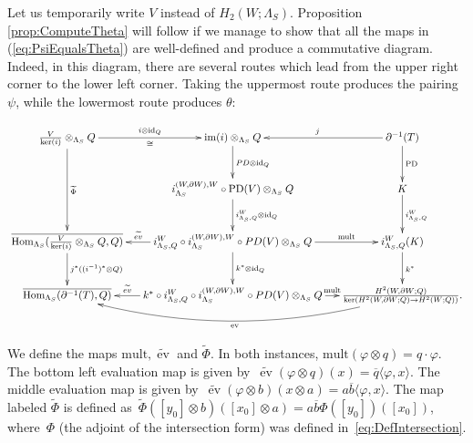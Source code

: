 \documentclass[11pt,a4paper]{amsart}
\theoremstyle{definition}
\newcommand{\id}{\operatorname{id}}
\newcommand{\im}{\operatorname{im}}
\DeclareMathOperator{\ev}{ev}
\def\op{\operatorname}
\begin{document}
Let us temporarily write $V$ instead of $H_2(W;\Lambda_S)$. Proposition \ref{prop:ComputeTheta} will follow if we manage to show that all the maps in (\ref{eq:PsiEqualsTheta}) are well-defined and produce a commutative diagram. Indeed, in this diagram, there are several routes which lead from the upper right corner to the lower left corner. Taking the uppermost route produces the pairing $\psi$, while the lowermost route produces $\theta$:

\begin{equation}
\label{eq:PsiEqualsTheta}
\xymatrix@R1cm@C0.45cm{
\frac{V}{\ker(i)} \otimes_{\Lambda_S} Q \ar[dd]^{\widetilde{\Phi}} \ar[r]^{i \otimes \id_Q}_\cong
& \im(i) \otimes_{\Lambda_S} Q \ar[d]^{PD \otimes  \id_Q}
& \partial^{-1}(T) \ar[l]_j \ar[d]^{\text{PD}} \\
&i_{\Lambda_S}^{(W,\partial W),W} \circ \text{PD} (V)  \otimes_{\Lambda_S} Q \ar[d]^{i^W_{\Lambda_S,Q} \otimes \id_Q}
& K \ar[d]^{i^W_{\Lambda_S,Q}} \\
\overline{\op{Hom}_{\Lambda_S}(\frac{V}{\ker(i)} \otimes_{\Lambda_S} Q,Q)}  \ar[d]^{  j^*((i^{-1})^*\otimes Q)  }
&  i^W_{\Lambda_S,Q} \circ i_{\Lambda_S}^{(W,\partial W),W} \circ PD(V)\otimes_{\Lambda_S} Q \ar[l]_-{{\widetilde{ev}}}  \ar[d]^{k^* \otimes \id_Q}  \ar[r]^-{\text{mult}}
&i^W_{\Lambda_S,Q}(K)  \ar[d]^{k^*}\\
\overline{\op{Hom}_{\Lambda_S}(\partial^{-1}(T),Q)} 
&  k^* \circ i^W_{\Lambda_S,Q} \circ i_{\Lambda_S}^{(W,\partial W),W} \circ PD(V) \otimes_{\Lambda_S} Q  \ar[r]^-{\text{mult}}  \ar[l]_-{{\widetilde{ev}}}
& \frac{H^2(W,\partial W;Q)}{\ker(H^2(W,\partial W;Q) \to H^2(W;Q))}. \ar@/^2pc/[ll]^{\text{ev}}
}
\end{equation}

We define the maps $\text{mult},\widetilde{\ev}$ and $\widetilde{\Phi}$.
In both instances, $\text{mult}(\varphi \otimes q)=q \cdot \varphi$.
The bottom left evaluation map is given by~$\widetilde{\ev}(\varphi \otimes q)(x)=\overline{q}\langle \varphi,x\rangle.$
The middle evaluation map is given by~$\widetilde{\ev}(\varphi \otimes b)(x \otimes a)=a\overline{b}\langle \varphi,x\rangle.$
The map labeled $\widetilde{\Phi}$ is defined as~$\widetilde{\Phi}([y_0] \otimes b)([x_0] \otimes a)=a\overline{b} \Phi([y_0])([x_0])$, where~$\Phi$ (the adjoint of the intersection form) was defined in~\eqref{eq:DefIntersection}.
\color{black}
\end{document}
